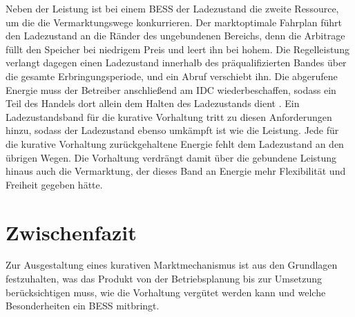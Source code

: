Neben der Leistung ist bei einem \ac{BESS} der Ladezustand die zweite Ressource, um die die Vermarktungswege konkurrieren.
Der marktoptimale Fahrplan führt den Ladezustand an die Ränder des ungebundenen Bereichs, denn die Arbitrage füllt den Speicher bei niedrigem Preis und leert ihn bei hohem.
Die Regelleistung verlangt dagegen einen Ladezustand innerhalb des präqualifizierten Bandes über die gesamte Erbringungsperiode, und ein Abruf verschiebt ihn.
Die abgerufene Energie muss der Betreiber anschließend am \ac{IDC} wiederbeschaffen, sodass ein Teil des Handels dort allein dem Halten des Ladezustands dient \cite{celi_cortes_m5use_2024}.
Ein Ladezustandsband für die kurative Vorhaltung tritt zu diesen Anforderungen hinzu, sodass der Ladezustand ebenso umkämpft ist wie die Leistung.
Jede für die kurative Vorhaltung zurückgehaltene Energie fehlt dem Ladezustand an den übrigen Wegen.
Die Vorhaltung verdrängt damit über die gebundene Leistung hinaus auch die Vermarktung, der dieses Band an Energie mehr Flexibilität und Freiheit gegeben hätte.

\section{Zwischenfazit}
\label{sec:interim_conclusion}

Zur Ausgestaltung eines kurativen Marktmechanismus ist aus den Grundlagen festzuhalten, was das Produkt von der Betriebsplanung bis zur Umsetzung berücksichtigen muss, wie die Vorhaltung vergütet werden kann und welche Besonderheiten ein \ac{BESS} mitbringt.

